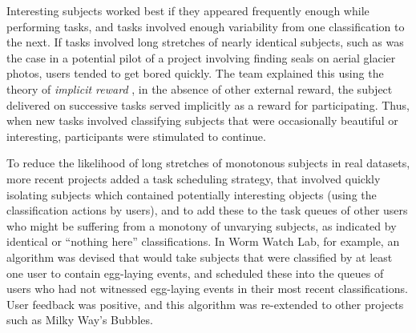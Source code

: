 \documentclass{sigchi}
\begin{document}
Interesting subjects worked best if they appeared frequently enough while performing tasks, and tasks involved enough variability from one classification to the next.  If tasks involved long stretches of nearly identical subjects, such as was the case in a potential pilot of a project involving finding seals on aerial glacier photos, users tended to get bored quickly. The team explained this using the theory of \emph{implicit reward} \cite{kluger1996effects}, in the absence of other external reward, the subject delivered on successive tasks served implicitly as a reward for participating. Thus, when new tasks involved classifying subjects that were occasionally beautiful or interesting, participants were stimulated to continue. %

To reduce the likelihood of long stretches of monotonous subjects in real datasets, more recent projects added a task scheduling strategy, that involved quickly isolating subjects which contained potentially interesting objects (using the classification actions by users), and to add these to the task queues of other users who might be suffering from a monotony of unvarying subjects, as indicated by identical or ``nothing here'' classifications.  In Worm Watch Lab, for example, an algorithm was devised that would take subjects that were classified by at least one user to contain egg-laying events, and scheduled these into the queues of users who had not witnessed egg-laying events in their most recent classifications.  User feedback was positive, and this algorithm was re-extended to other projects such as Milky Way's Bubbles. 


\end{document}
